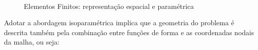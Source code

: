 \documentclass[tese_patricia]{subfiles}%
\begin{document}
\begin{figure}[!htb]
	\centering	
	\\
	\caption{Elementos Finitos: representação espacial e paramétrica}
\end{figure}

Adotar a abordagem isoparamétrica implica que a geometria do problema é descrita também pela combinação entre funções de forma e as coordenadas nodais da malha, ou seja:
\end{document}

